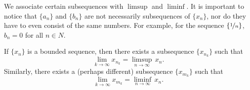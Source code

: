 We associate certain subsequences with $\limsup$ and $\liminf$.
It is important to notice that $\{ a_n \}$ and $\{ b_n \}$ are not
necessarily subsequences of $\{ x_n \}$, nor do they have to even 
consist of the same numbers.
For example, for the sequence $\{ \nicefrac{1}{n} \}$,
$b_n = 0$ for all $n \in N$.

\begin{thm} \label{subseqlimsupinf:thm}
If $\{ x_n \}$ is a bounded sequence, then there exists a subsequence
$\{ x_{n_k} \}$ such that
\begin{equation*}
\lim_{k\to \infty} x_{n_k} = \limsup_{n \to \infty} \, x_n .
\end{equation*}
Similarly, there exists a (perhaps different) subsequence
$\{ x_{m_k} \}$ such that
\begin{equation*}
\lim_{k\to \infty} x_{m_k} = \liminf_{n \to \infty} \, x_n .
\end{equation*}
\end{thm}

